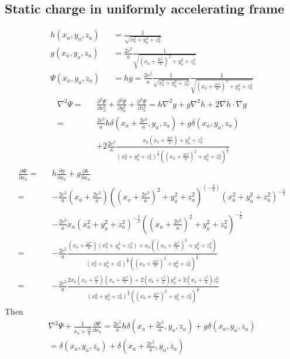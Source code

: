 \documentclass[prd,showpacs,preprint]{revtex4}
\begin{document}
\begin{appendix}
\section{Static charge in uniformly accelerating frame\label{app:Psi_Static}}
\begin{eqnarray}
h(x_a,y_a,z_a)&&=\frac{1}{\sqrt{x_a^2 + y_a^2 + z_a^2}}\nonumber\\
g(x_a,y_a,z_a)&&=\frac{2c^2}{a}\frac{1}{\sqrt{(x_a+\frac{2c^2}{a})^2+y_a^2+z_a^2}}\nonumber\\
\Psi(x_a,y_a,z_a)&&=hg=\frac{2c^2}{a}\frac{1}{\sqrt{x_a^2 + y_a^2 + z_a^2}}\frac{1}{\sqrt{(x_a+\frac{2c^2}{a})^2+y_a^2+z_a^2}}
\end{eqnarray}
\begin{eqnarray}
\nabla^2\Psi=&&\frac{\partial^2 \Psi}{\partial x_a^2}+\frac{\partial^2 \Psi}{\partial y_a^2}+\frac{\partial^2 \Psi}{\partial z_a^2} = h\nabla^2 g + g\nabla^2 h + 2\nabla h\cdot\nabla g\nonumber\\
=&&\frac{2c^2}{a}h\delta(x_a+\frac{2c^2}{a},y_a,z_a) + g\delta(x_a,y_a,z_a)\nonumber\\
&&+ 2\frac{2c^2}{a}\frac{x_a(x_a+\frac{2c^2}{a})+y_a^2+z_a^2}{(x_a^2+y_a^2+z_a^2)^{\frac{3}{2}}((x_a+\frac{2c^2}{a})^2+y_a^2+z_a^2)^{\frac{3}{2}}}
\end{eqnarray}
\begin{eqnarray}
\frac{\partial\Psi}{\partial x_a}=&&h\frac{\partial g}{\partial x_a}+g\frac{\partial h}{\partial x_a}\nonumber\\
=&&-\frac{2c^2}{a}(x_a+\frac{2c^2}{a})((x_a+\frac{2c^2}{a})^2+y_a^2+z_a^2)^{(-\frac{3}{2})}(x_a^2+y_a^2+z_a^2)^{-\frac{1}{2}}\nonumber\\
&&-\frac{2c^2}{a}x_a(x_a^2+y_a^2+z_a^2)^{-\frac{3}{2}}((x_a+\frac{2c^2}{a})^2+y_a^2+z_a^2)^{-\frac{1}{2}}\nonumber\\
=&&-\frac{2c^2}{a}\frac{(x_a+\frac{2c^2}{a})(x_a^2+y_a^2+z_a^2)+x_a((x_a+\frac{2c^2}{a})^2+y_a^2+z_a^2)}{(x_a^2+y_a^2+z_a^2)^{\frac{3}{2}}((x_a+\frac{2c^2}{a})^2 + y_a^2+z_a^2)^{\frac{3}{2}}}\nonumber\\
=&&-\frac{2c^2}{a}\frac{2x_a(x_a+\frac{c^2}{a})(x_a+\frac{2c^2}{a}) + 2(x_a+\frac{c^2}{a})y_a^2 + 2(x_a+\frac{c^2}{a})z_a^2}{(x_a^2+y_a^2+z_a^2)^{\frac{3}{2}}((x_a+\frac{2c^2}{a})^2 + y_a^2+z_a^2)^{\frac{3}{2}}}
\end{eqnarray}
Then
\begin{eqnarray}
\nabla^2\Psi + \frac{1}{x_a+\frac{c^2}{a}}\frac{\partial\Psi}{\partial x_a} = \frac{2c^2}{a}h\delta(x_a+\frac{2c^2}{a},y_a,z_a) + g\delta(x_a,y_a,z_a)\nonumber\\
=\delta(x_a,y_a,z_a)+\delta(x_a+\frac{2c^2}{a},y_a,z_a)
\end{eqnarray}


\end{appendix}
\end{document}
